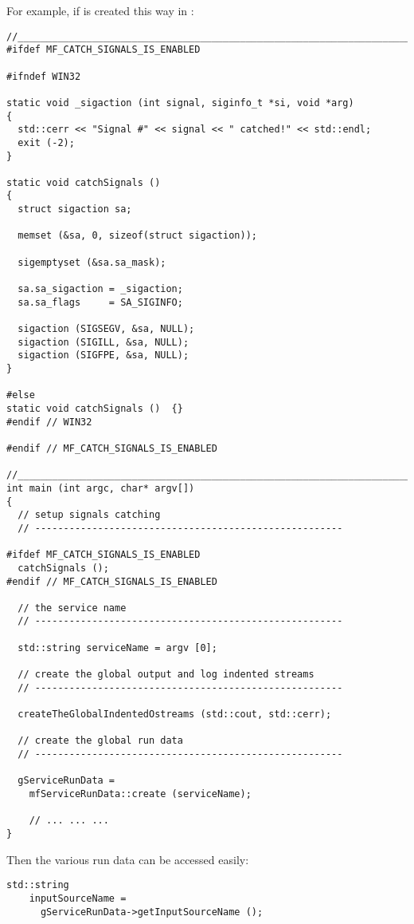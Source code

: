 For example, if is created this way in :
\begin{lstlisting}[language=CPlusPlus]
//_______________________________________________________________________________
#ifdef MF_CATCH_SIGNALS_IS_ENABLED

#ifndef WIN32

static void _sigaction (int signal, siginfo_t *si, void *arg)
{
  std::cerr << "Signal #" << signal << " catched!" << std::endl;
  exit (-2);
}

static void catchSignals ()
{
  struct sigaction sa;

  memset (&sa, 0, sizeof(struct sigaction));

  sigemptyset (&sa.sa_mask);

  sa.sa_sigaction = _sigaction;
  sa.sa_flags     = SA_SIGINFO;

  sigaction (SIGSEGV, &sa, NULL);
  sigaction (SIGILL, &sa, NULL);
  sigaction (SIGFPE, &sa, NULL);
}

#else
static void catchSignals ()  {}
#endif // WIN32

#endif // MF_CATCH_SIGNALS_IS_ENABLED

//_______________________________________________________________________________
int main (int argc, char* argv[])
{
  // setup signals catching
  // ------------------------------------------------------

#ifdef MF_CATCH_SIGNALS_IS_ENABLED
  catchSignals ();
#endif // MF_CATCH_SIGNALS_IS_ENABLED

  // the service name
  // ------------------------------------------------------

  std::string serviceName = argv [0];

  // create the global output and log indented streams
  // ------------------------------------------------------

  createTheGlobalIndentedOstreams (std::cout, std::cerr);

  // create the global run data
  // ------------------------------------------------------

  gServiceRunData =
    mfServiceRunData::create (serviceName);

	// ... ... ...
}
\end{lstlisting}

Then the various run data can be accessed easily:
\begin{lstlisting}[language=CPlusPlus]
  std::string
    inputSourceName =
      gServiceRunData->getInputSourceName ();
\end{lstlisting}

